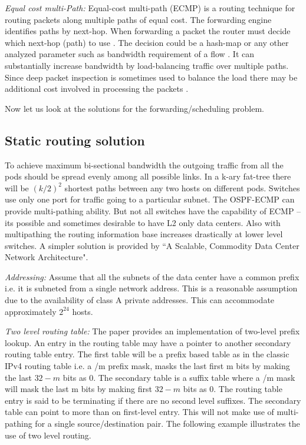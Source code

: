 \documentclass[11pt,letterpaper,onecolumn]{article}
\begin{document}
\par{\textit{Equal cost multi-Path:} Equal-cost multi-path (ECMP) is a routing technique for routing packets along multiple paths of equal cost.  The forwarding engine identifies paths by next-hop.  When forwarding a packet the router must decide which next-hop (path) to use \cite{hopps2000analysis}. The decision could be a hash-map or any other analyzed parameter such as bandwidth requirement of a flow . It can substantially increase bandwidth by load-balancing traffic over multiple paths. Since deep packet inspection is sometimes used to balance the load there may be additional cost involved in processing the packets \cite{wiki:003}.}\\

\par{Now let us look at the solutions for the forwarding/scheduling problem.}\\

\subsection{Static routing solution}

\par{\qquad To achieve maximum bi-sectional bandwidth the outgoing traffic from all the pods should be spread evenly among all possible links. In a k-ary fat-tree there will be $(k/2)^2$ shortest paths between any two hosts on different pods. Switches use only one port for traffic going to a particular subnet. The OSPF-ECMP can provide multi-pathing ability. But not all switches have the capability of ECMP  -- its possible and sometimes desirable to have L2 only data centers. Also with multipathing the routing information base increases drastically at lower level switches. A simpler solution is provided by ``A Scalable, Commodity Data Center Network Architecture"\cite{al2008scalable}.}\\

\par{\textit{Addressing:} Assume that all the subnets of the data center have a common prefix i.e. it is subneted from a single network address. This is a reasonable assumption due to the availability of class A private addresses. This can accommodate approximately $2^24$ hosts.}\\

\par{\textit{Two level routing table:} The paper \cite{al2008scalable} provides an implementation of two-level prefix lookup. An entry in the routing table may have a pointer to another secondary routing table entry. The first table will be a prefix based table as in the classic IPv4 routing table i.e. a /m prefix mask, masks the last first m bits by making the last $32-m$ bits as $0$. The secondary table is a suffix table where a /m mask will mask the last m bits by making first $32 - m$ bits as $0$. The routing table entry is said to be terminating if there are no second level suffixes. The secondary table can point to more than on first-level entry. This will not make use of multi-pathing for a single source/destination pair. The following example illustrates the use of two level routing.}\\
\end{document}
